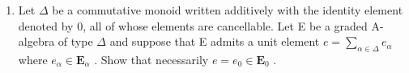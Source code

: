 \BourbakiExercisesSection

\begin{enumerate}
\def\labelenumi{\arabic{enumi}.}
\tightlist
\item
  Let \(\Delta\) be a commutative monoid written additively with the identity element denoted by 0, all of whose elements are cancellable. Let E be a graded A-algebra of type \(\Delta\) and suppose that E admits a unit element \(e = \sum_{\alpha \in \Delta} e_{\alpha}\) where \(e_{\alpha} \in \mathbf{E}_{\alpha}\) . Show that necessarily \(e = e_0 \in \mathbf{E}_0\) .
\end{enumerate}
